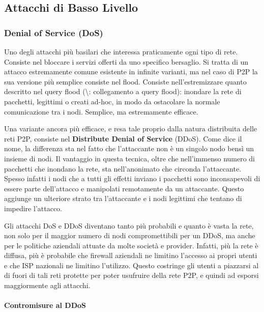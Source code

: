\subsection{Attacchi di Basso Livello}\label{attacchi-di-basso-livello}

\subsubsection{Denial of Service (DoS)}\label{denial-of-service-dos}

Uno degli attacchi più basilari che interessa praticamente ogni tipo di rete. Consiste nel bloccare i servizi offerti da uno specifico bersaglio. Si tratta di un attacco estremamente comune esistente in infinite varianti, ma nel caso di P2P la sua versione più semplice consiste nel flood. Consiste nell'estremizzare quanto descritto nel query flood (\textbackslash{}\TODO: collegamento a query flood): inondare la rete di pacchetti, legittimi o creati ad-hoc, in modo da ostacolare la normale comunicazione tra i nodi. Semplice, ma estremamente efficace.

Una variante ancora più efficace, e resa tale proprio dalla natura distribuita delle reti P2P, consiste nel \textbf{Distribute Denial of Service} (DDoS). Come dice il nome, la differenza sta nel fatto che l'attaccante non è un singolo nodo bensì un insieme di nodi. Il vantaggio in questa tecnica, oltre che nell'immenso numero di pacchetti che inondano la rete, sta nell'anonimato che circonda l'attaccante. Spesso infatti i nodi che a tutti gli effetti inviano i pacchetti sono inconsapevoli di essere parte dell'attacco e manipolati remotamente da un attaccante. Questo aggiunge un ulteriore strato tra l'attaccante e i nodi legittimi che tentano di impedire l'attacco.

Gli attacchi DoS e DDoS diventano tanto più probabili e quanto è vasta la rete, non solo per il maggior numero di nodi compromettibili per un DDoS, ma anche per le politiche aziendali attuate da molte società e provider. Infatti, più la rete è diffusa, più è probabile che firewall aziendali ne limitino l'accesso ai propri utenti e che ISP nazionali ne limitino l'utilizzo. Questo costringe gli utenti a piazzarsi al di fuori di tali reti protette per poter usufruire della rete P2P, e quindi ad esporsi maggiormente agli attacchi.

\paragraph{Contromisure al DDoS}\label{contromisure-al-ddos}

